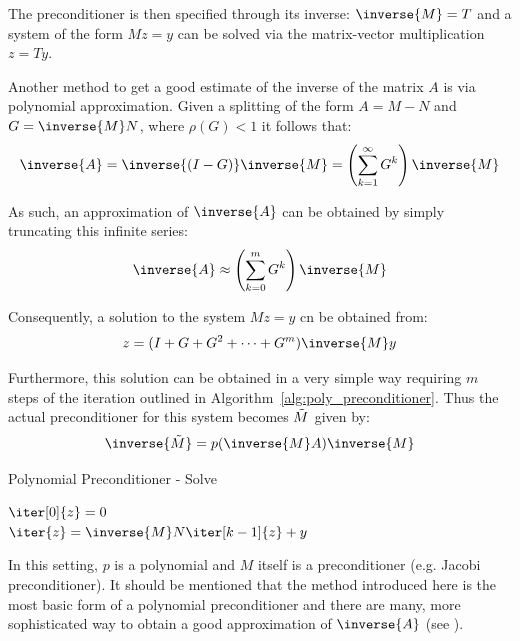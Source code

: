 \noindent The preconditioner is then specified through its inverse: $\inverse{M}=T$ and a system of the form $Mz=y$ can be solved via the matrix-vector multiplication $z=Ty$.

Another method to get a good estimate of the inverse of the matrix $A$ is via polynomial approximation. Given a splitting of the form $A=M-N$ and $G=\inverse{M}N$, where $\rho(G)<1$ it follows that:
\begin{equation}
    \inverse{A}=\inverse{(I-G)}\inverse{M} = \left(\sum_{k=1}^{\infty}G^k\right)\inverse{M}
\end{equation}

\noindent As such, an approximation of $\inverse{A}$ can be obtained by simply truncating this infinite series:
\begin{equation}
    \inverse{A} \approx \left(\sum_{k=0}^{m}G^k\right)\inverse{M}
\end{equation}

\noindent Consequently, a solution to the system $Mz=y$ cn be obtained from:
\begin{equation}
    z = (I+G+G^2+\dots+G^m)\inverse{M}y
\end{equation}

\noindent Furthermore, this solution can be obtained in a very simple way requiring $m$ steps of the iteration outlined in Algorithm~\hyperref[alg:poly_preconditioner]{\ref{alg:poly_preconditioner}}. Thus the actual preconditioner for this system becomes $\Tilde{M}$ given by:
\begin{equation}
    \inverse{\Tilde{M}}=p(\inverse{M}A)\inverse{M}
\end{equation}

\begin{algorithm}[h]
  \caption{Polynomial Preconditioner - Solve}
  \label{alg:poly_preconditioner}
  \SetAlgoLined
  \DontPrintSemicolon
  $\iter[0]{z} = 0$ \\
   {
    $\iter{z} = \inverse{M}N\iter[k-1]{z}+y$ \\
  }
\end{algorithm}

\noindent In this setting, $p$ is a polynomial and $M$ itself is a preconditioner (e.g. Jacobi preconditioner). It should be mentioned that the method introduced here is the most basic form of a polynomial preconditioner and there are many, more sophisticated way to obtain a good approximation of $\inverse{A}$ (see \cite{golub_matrix_2013}).


